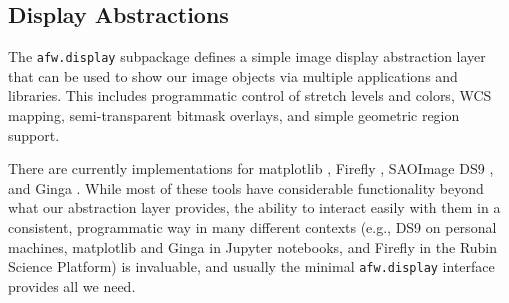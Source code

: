 \subsection{Display Abstractions}
\label{sec:display}

The \texttt{afw.display} subpackage defines a simple image display abstraction layer that can be used to show our image objects via multiple applications and libraries.
This includes programmatic control of stretch levels and colors, WCS mapping, semi-transparent bitmask overlays, and simple geometric region support.

There are currently implementations for matplotlib \citep{2007CSE.....9...90H}, Firefly \citep{2020ASPC..527..243R}, SAOImage DS9 \citep{2003ASPC..295..489J}, and Ginga \citep[][via Astrowidgets]{2013ASPC..475..319J}.
While most of these tools have considerable functionality beyond what our abstraction layer provides, the ability to interact easily with them in a consistent, programmatic way in many different contexts (e.g., DS9 on personal machines, matplotlib and Ginga in Jupyter notebooks, and Firefly in the Rubin Science Platform) is invaluable, and usually the minimal \texttt{afw.display} interface provides all we need.
